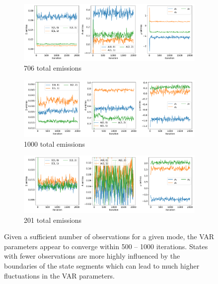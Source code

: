 \documentclass{article}
\begin{document}
  \begin{figure}[h]
  \centering
  \begin{subfigure}{0.8\textwidth}
  \includegraphics[width=\textwidth]{convergence_MET_47.pdf}
  \caption{706 total emissions}\label{fig:convergence3d_MET_low}
  \end{subfigure}
  \begin{subfigure}{0.8\textwidth}
  \includegraphics[width=\textwidth]{convergence_MET_36.pdf}
  \caption{1000 total emissions}\label{fig:convergence3d_MET_medium}
  \end{subfigure}
  \begin{subfigure}{0.8\textwidth}
  \includegraphics[width=\textwidth]{convergence_MET_59.pdf}
  \caption{201 total emissions}\label{fig:convergence3d_MET_high}
  \end{subfigure}
  \caption{Given a sufficient number of observations for a given mode, the VAR parameters
  appear to converge within 500 -- 1000 iterations. States with fewer observations
  are more highly influenced by the boundaries of the state segments which can
  lead to much higher fluctuations in the VAR parameters.}\label{fig:convergence3d}
  \end{figure}
  
\end{document}
